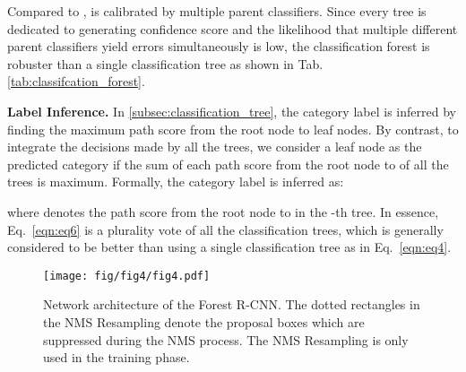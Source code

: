 \documentclass[sigconf]{acmart}
\newcommand{\myparagraph}[1]{{\vspace{0.5em} \noindent \bf #1}}
\begin{document}
Compared to ,  is calibrated by multiple parent classifiers. Since every tree is dedicated to generating confidence score and the likelihood that multiple different parent classifiers yield errors simultaneously is low, the classification forest is robuster than a single classification tree as shown in Tab.\ref{tab:classifcation_forest}. 

\myparagraph{Label Inference.} In \cref{subsec:classification_tree}, the category label is inferred by finding the maximum path score from the root node to leaf nodes. By contrast, to integrate the decisions made by all the trees, we consider a leaf node  as the predicted category if the sum of each path score from the root node to  of all the trees is maximum. Formally, the category label is inferred as:

where  denotes the path score from the root node to  in the -th tree. In essence, Eq.~\ref{eqn:eq6} is a plurality vote of all the classification trees, which is generally considered to be better than using a single classification tree as in Eq.~\ref{eqn:eq4}.

\begin{figure}
	\centering
	\texttt{[image: fig/fig4/fig4.pdf]}
	\vspace{-4mm}
	\caption{Network architecture of the Forest R-CNN. The dotted rectangles in the NMS Resampling denote the proposal boxes which are suppressed during the NMS process. The NMS Resampling is only used in the training phase.}
	\label{fig:network_architecture}
	\vspace{-3mm}
\end{figure}
\end{document}
